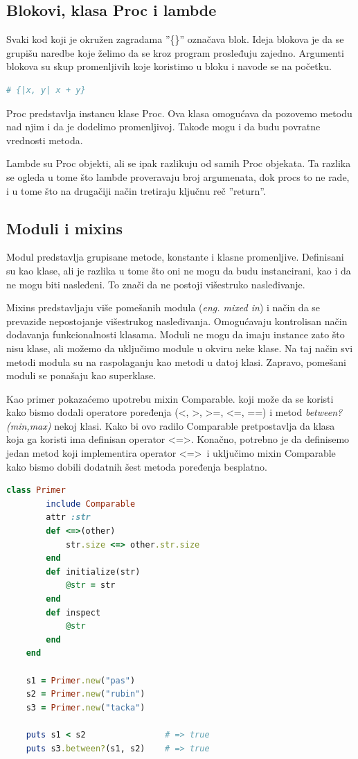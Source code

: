 \documentclass[a4paper]{article}
\begin{document}
\subsection{Blokovi, klasa Proc i lambde}
Svaki kod koji je okružen zagradama ''\{\}'' označava blok. Ideja blokova je da se grupišu naredbe koje želimo da se kroz program prosleđuju zajedno. Argumenti blokova su skup promenljivih koje koristimo u bloku i navode se na početku.
\begin{lstlisting}[language=Ruby]
	# {|x, y| x + y}
\end{lstlisting}\vspace*{-15pt}
Proc predstavlja instancu klase Proc. Ova klasa omogućava da pozovemo metodu nad njim i da je dodelimo promenljivoj. Takođe mogu i da budu povratne vrednosti metoda.

Lambde su Proc objekti, ali se ipak razlikuju od samih Proc objekata. Ta razlika se ogleda u tome što lambde proveravaju broj argumenata, dok procs to ne rade, i u tome što na drugačiji način tretiraju ključnu reč ''return''.

\subsection{Moduli i mixins}
Modul predstavlja grupisane metode, konstante i klasne promenljive. Definisani su kao klase, ali je razlika u tome što oni ne mogu da budu instancirani, kao i da ne mogu biti nasleđeni. To znači da ne postoji višestruko nasleđivanje.

Mixins predstavljaju više pomešanih modula (\emph{eng. mixed in}) i način da se prevaziđe nepostojanje višestrukog nasleđivanja. Omogućavaju kontrolisan način dodavanja funkcionalnosti klasama. Moduli ne mogu da imaju instance zato što nisu klase, ali možemo da uključimo module u okviru neke klase. Na taj način svi metodi modula su na raspolaganju kao metodi u datoj klasi. Zapravo, pomešani moduli se ponašaju kao superklase.

Kao primer pokazaćemo upotrebu mixin Comparable. koji može da se koristi kako bismo dodali operatore poređenja (\textless , \textgreater , \textgreater =, \textless =, ==) i metod \emph{between?(min,max)} nekoj klasi. Kako bi ovo radilo Comparable pretpostavlja da klasa koja ga koristi ima definisan operator \textless =\textgreater. Konačno, potrebno je da definisemo jedan metod koji implementira operator \textless =\textgreater \ i uključimo mixin Comparable kako bismo dobili dodatnih šest metoda poređenja besplatno.
\begin{lstlisting}[language=Ruby]
	class Primer
		include Comparable
		attr :str
		def <=>(other)
			str.size <=> other.str.size
		end
		def initialize(str)
			@str = str
		end
		def inspect
			@str
		end
	end
	
	s1 = Primer.new("pas")
	s2 = Primer.new("rubin")
	s3 = Primer.new("tacka")
	
	puts s1 < s2 				# => true
	puts s3.between?(s1, s2)	# => true
	
\end{lstlisting}\vspace*{-15pt}
\end{document}
